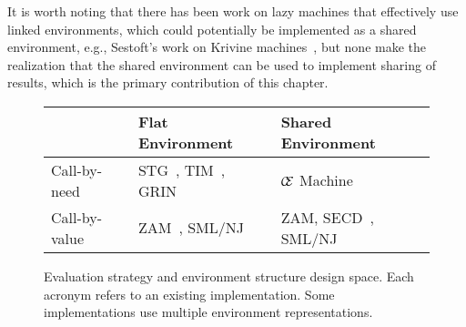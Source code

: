 It is worth noting that there has been work on lazy machines that effectively use
linked environments, which could potentially be implemented as a shared
environment, e.g., Sestoft's work on Krivine machines~\cite{sestoft}, but none
make the realization that the shared environment can be used to implement
sharing of results, which is the primary contribution of this chapter.

\begin{figure}
\begin{tabularx}{\textwidth}{l | X | X}
                & Flat Environment     & Shared Environment \\ \hline
  Call-by-need  & STG~\cite{jonesstg}, 
                  TIM~\cite{TIM}, 
                  GRIN~\cite{boquist1997grin} 
                & $\mathcal{\mathcal{C} \mskip -4mu \mathcal{E}}$ Machine \\
  Call-by-value & ZAM~\cite{leroy1990zinc}, 
                  SML/NJ~\cite{appel1991standard}
                & ZAM,
                  SECD~\cite{landin1964mechanical}, 
                  SML/NJ \\
\end{tabularx}
\caption{Evaluation strategy and environment structure design space. Each
acronym refers to an existing implementation. Some implementations use multiple
environment representations.}
\label{fig:designspace}
\end{figure}

